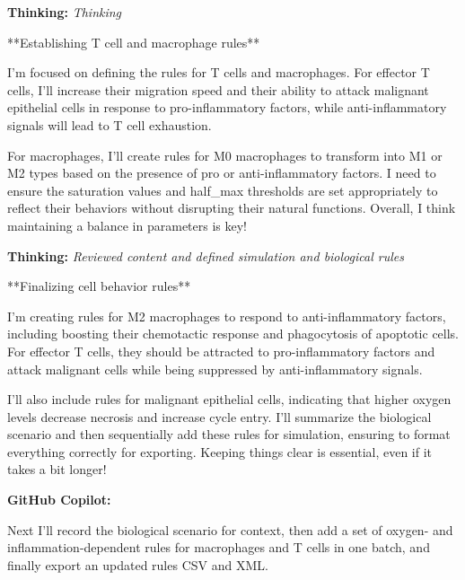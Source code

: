 \documentclass[11pt,a4paper]{article}
\begin{document}
\begin{thinkbox}
\textbf{Thinking:} \textit{Thinking}

**Establishing T cell and macrophage rules**

I'm focused on defining the rules for T cells and macrophages. For effector T cells, I'll increase their migration speed and their ability to attack malignant epithelial cells in response to pro-inflammatory factors, while anti-inflammatory signals will lead to T cell exhaustion.

For macrophages, I’ll create rules for M0 macrophages to transform into M1 or M2 types based on the presence of pro or anti-inflammatory factors. I need to ensure the saturation values and half\_max thresholds are set appropriately to reflect their behaviors without disrupting their natural functions. Overall, I think maintaining a balance in parameters is key!

\end{thinkbox}
\begin{thinkbox}
\textbf{Thinking:} \textit{Reviewed content and defined simulation and biological rules}

**Finalizing cell behavior rules**

I'm creating rules for M2 macrophages to respond to anti-inflammatory factors, including boosting their chemotactic response and phagocytosis of apoptotic cells. For effector T cells, they should be attracted to pro-inflammatory factors and attack malignant cells while being suppressed by anti-inflammatory signals.

I’ll also include rules for malignant epithelial cells, indicating that higher oxygen levels decrease necrosis and increase cycle entry. I'll summarize the biological scenario and then sequentially add these rules for simulation, ensuring to format everything correctly for exporting. Keeping things clear is essential, even if it takes a bit longer!

\end{thinkbox}
\begin{copilotbox}
\textbf{GitHub Copilot:}

Next I’ll record the biological scenario for context, then add a set of oxygen- and inflammation-dependent rules for macrophages and T cells in one batch, and finally export an updated rules CSV and XML.

\end{copilotbox}
\end{document}
